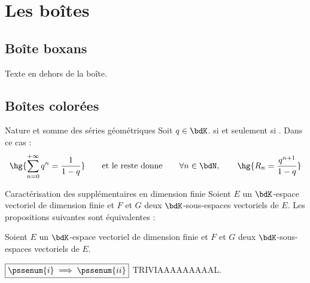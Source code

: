 \documentclass[a4paper,french,bookmarks]{article}
\begin{document}
    
    \initcours{}
    
    \section{Les boîtes}
    
    \subsection{Boîte boxans}
    
    Texte en dehors de la boîte. 
    
    
    \subsection{Boîtes colorées}
    
    \begin{theorem}{Nature et somme des séries géométriques}{}
        Soit $q \in \bdK$.  si et seulement si . Dans ce cas :
        \[ \hg{\sum_{n=0}^{+\infty} q^n = \dfrac{1}{1-q}} \qquad\text{et le reste donne}\qquad \forall n \in \bdN,\qquad \hg{R_n = \dfrac{q^{n+1}}{1-q}} \]
    \end{theorem}
    
    \begin{theorem*}{Caractérisation des supplémentaires en dimension finie}{}
        Soient $E$ un $\bdK$-espace vectoriel de dimension finie et $F$ et $G$ deux $\bdK$-sous-espaces vectoriels de $E$. Les propositions suivantes sont équivalentes :
        
        \begin{psse}
            \item {}
            \item {}
            \item {}
        \end{psse}
    \end{theorem*}
    
    \begin{nproof}
        Soient $E$ un $\bdK$-espace vectoriel de dimension finie et $F$ et $G$ deux $\bdK$-sous-espaces vectoriels de $E$.
        
        \begin{enumerate}
            \itt $\boxed{\pssenum{i} \implies \pssenum{ii}}$ TRIVIAAAAAAAAAL.
        \end{enumerate}
    \end{nproof}
    
\end{document}
